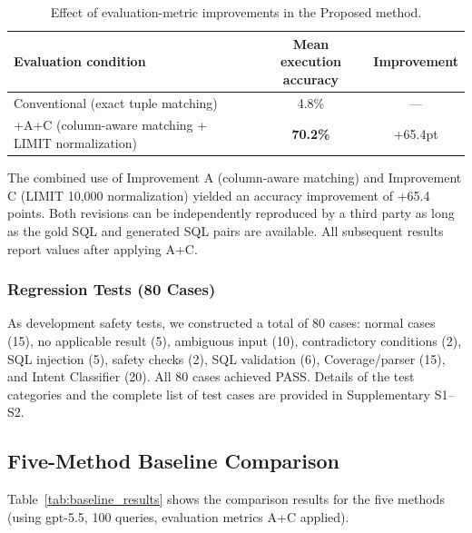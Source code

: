 \documentclass[5p,twocolumn]{elsarticle}
\begin{document}
\begin{table}[htbp]
  \centering
  \caption{Effect of evaluation-metric improvements in the Proposed method.}
  \label{tab:metric_improvement}
  \small
  \begin{tabular}{p{4.8cm}cc}
    \toprule
    Evaluation condition & \shortstack{Mean\\execution accuracy} & Improvement \\
    \midrule
    Conventional (exact tuple matching) & 4.8\% & --- \\
    +A+C (column-aware matching + LIMIT normalization) & \textbf{70.2\%} & +65.4pt \\
    \bottomrule
  \end{tabular}
\end{table}

The combined use of Improvement A (column-aware matching) and Improvement C (LIMIT 10{,}000 normalization) yielded an accuracy improvement of +65.4 points.
Both revisions can be independently reproduced by a third party as long as the gold SQL and generated SQL pairs are available.
All subsequent results report values after applying A+C.

\subsubsection{Regression Tests (80 Cases)}

As development safety tests, we constructed a total of 80 cases:
normal cases (15), no applicable result (5),
ambiguous input (10), contradictory conditions (2), SQL injection (5),
safety checks (2), SQL validation (6), Coverage/parser (15),
and Intent Classifier (20).
All 80 cases achieved PASS.
Details of the test categories and the complete list of test cases are provided in
Supplementary S1--S2.

\subsection{Five-Method Baseline Comparison}
\label{sec:baseline_comparison}

Table~\ref{tab:baseline_results} shows the comparison results for the five methods (using gpt-5.5, 100 queries, evaluation metrics A+C applied).
\end{document}
